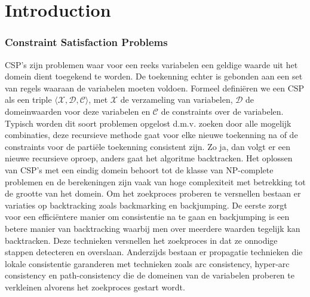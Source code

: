 \chapter{Introduction}
\label{cha:intro}

\subsection{Constraint Satisfaction Problems}
CSP's zijn problemen waar voor een reeks variabelen een geldige waarde uit het domein dient toegekend te worden. De toekenning echter is gebonden aan een set van regels waaraan de variabelen moeten voldoen. Formeel defini\"{e}ren we een CSP als een triple $\langle \mathcal{X},\mathcal{D},\mathcal{C} \rangle$, met $\mathcal{X}$ de verzameling van variabelen, $\mathcal{D}$ de domeinwaarden voor deze variabelen en $\mathcal{C}$ de constraints over de variabelen. Typisch worden dit soort problemen opgelost d.m.v. zoeken door alle mogelijk combinaties, deze recursieve methode gaat voor elke nieuwe toekenning na of de constraints voor de parti\"{e}le toekenning consistent zijn. Zo ja, dan volgt er een nieuwe recursieve oproep, anders gaat het algoritme backtracken. Het oplossen van CSP's met een eindig domein behoort tot de klasse van NP-complete problemen en de berekeningen zijn vaak van hoge complexiteit met betrekking tot de grootte van het domein. Om het zoekproces proberen te versnellen bestaan er variaties op backtracking zoals backmarking en backjumping. De eerste zorgt voor een effici\"{e}ntere manier om consistentie na te gaan en backjumping is een betere manier van backtracking waarbij men over meerdere waarden tegelijk kan backtracken. Deze technieken versnellen het zoekproces in dat ze onnodige stappen detecteren en overslaan. Anderzijds bestaan er propagatie technieken die lokale consistentie garanderen met technieken zoals arc consistency, hyper-arc consistency en path-consistency die de domeinen van de variabelen proberen te verkleinen alvorens het zoekproces gestart wordt. 


